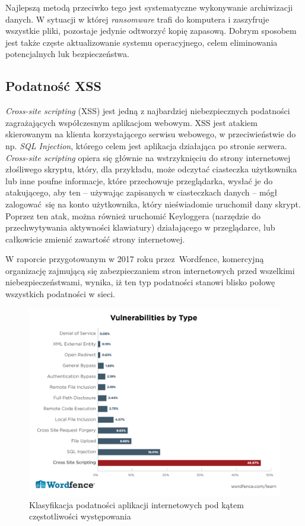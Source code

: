 \documentclass[12pt,twoside]{article}
\begin{document}
Najlepszą metodą przeciwko tego  jest systematyczne wykonywanie archiwizacji danych. W sytuacji w której \emph{ransomware} trafi do komputera i zaszyfruje wszystkie pliki, pozostaje jedynie odtworzyć kopię zapasową. Dobrym sposobem jest także częste aktualizowanie systemu operacyjnego, celem eliminowania potencjalnych luk bezpieczeństwa.

\clearpage


\subsection{Podatność XSS}

\emph{Cross-site scripting} (XSS) jest jedną z najbardziej niebezpiecznych podatności zagrażających współczesnym aplikacjom webowym. XSS jest atakiem skierowanym na klienta korzystającego serwisu webowego, w przeciwieństwie do np. \emph{SQL Injection}, którego celem jest aplikacja działająca po stronie serwera. \emph{Cross-site scripting} opiera się głównie na wstrzyknięciu do strony internetowej złośliwego skryptu, który, dla przykładu, może odczytać ciasteczka użytkownika lub inne poufne informacje, które przechowuje przeglądarka, wysłać je do atakującego, aby ten -- używając zapisanych w ciasteczkach danych -- mógł zalogować się na konto użytkownika, który nieświadomie uruchomił dany skrypt. Poprzez ten atak, można również uruchomić Keyloggera (narzędzie do przechwytywania aktywności klawiatury) działającego w przeglądarce, lub całkowicie zmienić zawartość strony internetowej. 

W raporcie przygotowanym w 2017 roku przez Wordfence, komercyjną organizację zajmującą się zabezpieczaniem stron internetowych przed wszelkimi niebezpieczeństwami, wynika, iż ten typ podatności stanowi blisko połowę wszystkich podatności w sieci. \cite{XSSReport}

\begin{figure}[H]
	\centering
	\includegraphics[width=0.9\linewidth]{figures/xss-popularity}
	\caption{Klasyfikacja podatności aplikacji internetowych pod kątem częstotliwości występowania}
	\label{fig:xss-popularity}
\end{figure}
\end{document}
